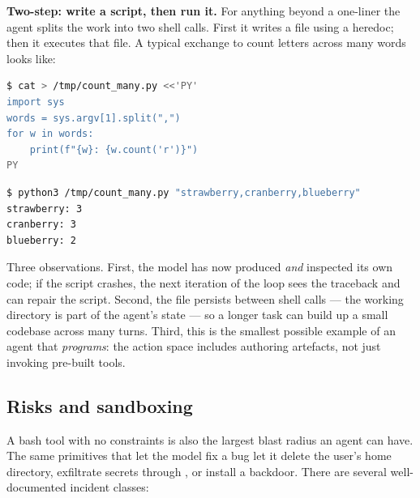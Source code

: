 \begin{examplebox}
\small
\textbf{Two-step: write a script, then run it.} For anything beyond
a one-liner the agent splits the work into two shell calls. First it
writes a file using a heredoc; then it executes that file. A typical
exchange to count letters across many words looks like:

\begin{lstlisting}[language=bash,caption={First shell call --- create a script file.}]
$ cat > /tmp/count_many.py <<'PY'
import sys
words = sys.argv[1].split(",")
for w in words:
    print(f"{w}: {w.count('r')}")
PY
\end{lstlisting}

\begin{lstlisting}[language=bash,caption={Second shell call --- execute the script.}]
$ python3 /tmp/count_many.py "strawberry,cranberry,blueberry"
strawberry: 3
cranberry: 3
blueberry: 2
\end{lstlisting}

\noindent
Three observations. First, the model has now produced \emph{and}
inspected its own code; if the script crashes, the next iteration of
the loop sees the traceback and can repair the script. Second, the
file persists between shell calls --- the working directory is part
of the agent's state --- so a longer task can build up a small
codebase across many turns. Third, this is the smallest possible
example of an agent that \emph{programs}: the action space includes
authoring artefacts, not just invoking pre-built tools.
\end{examplebox}

\subsection{Risks and sandboxing}
\label{sec:sandbox}

A bash tool with no constraints is also the largest blast radius an
agent can have. The same primitives that let the model fix a bug let
it delete the user's home directory, exfiltrate secrets through
, or install a backdoor. There are several well-documented
incident classes:

